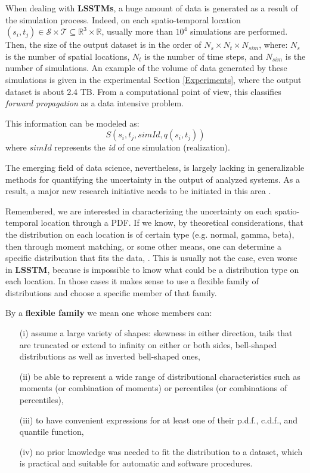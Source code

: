 When dealing with \textbf{LSSTMs}, a huge amount of data is generated as a result of the simulation process. Indeed, on each spatio-temporal location $(s_{i},t_{j}) \in \mathcal{S} \times \mathcal{T}\subseteq\mathbb{R}^{3}\times\mathbb{R}$, usually more than $10^4$ simulations are performed. Then, the size of the output dataset is in the order of $N_{s}\times N_{t}\times N_{sim}$, where: $N_{s}$ is the number of spatial locations, $N_{t}$ is the number of time steps, and $N_{sim}$ is the number of simulations.  An example of the volume of data generated by these simulations is given in the experimental Section \ref{Experiments}, where the output dataset is about 2.4 TB. From a computational point of view, this classifies \textit{forward propagation} as a data intensive problem.

This information can be modeled as:
\begin{equation}\label{eq:data_base_structure}
S(s_{i},t_{j},simId,q(s_{i},t_{j}))
\end{equation}
where $simId$ represents the \textit{id} of one simulation (realization).

The emerging field of data science, nevertheless, is largely lacking in generalizable methods for quantifying the uncertainty in the output of analyzed systems. As a result, a major new research initiative needs to be initiated in this area \cite{Tobergte2013}.

Remembered, we are interested in characterizing the uncertainty on each spatio-temporal location through a PDF. If we know, by theoretical considerations, that the distribution on each location is of certain type (e.g. normal, gamma, beta), then through moment matching, or some other means, one can determine a specific distribution that fits the data, \cite{Karian2011, Mustafa2016}. This is usually not the case, even worse in \textbf{LSSTM}, because is impossible to know what could be a distribution type on each location. In those cases it makes sense to use a flexible family of distributions and choose a specific member of that family.

By a \textbf{flexible family} we mean one whose members can:

\begin{itemize}
\item[(i)] assume a large variety of shapes: skewness in either direction, tails that are truncated or extend to infinity on either or both sides, bell-shaped distributions as well as inverted bell-shaped ones,
\item[(ii)] be able to represent a wide range of distributional characteristics such as moments (or combination of moments) or percentiles (or combinations of percentiles),
\item[(iii)] to have convenient expressions for at least one of their p.d.f., c.d.f., and quantile function,
\item[(iv)] no prior knowledge was needed to fit the distribution to a dataset, which is practical and suitable for automatic and software procedures.
\end{itemize} 

